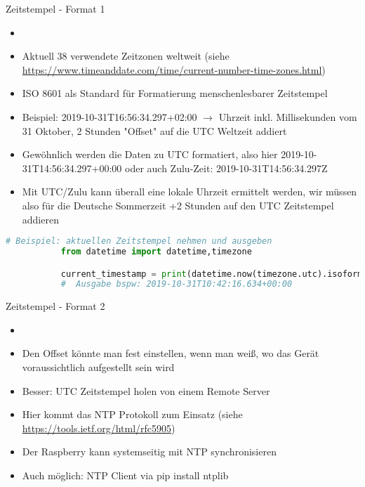 \begin{frame}[fragile]{Zeitstempel - Format 1}
    \begin{itemize}
        \setlength{\itemindent}{2.4in}
        \item [\textbf{Wie sollten Zeitstempel formatiert sein?}]
    \end{itemize}

    \begin{itemize}
              \item Aktuell 38 verwendete Zeitzonen weltweit (siehe \url{https://www.timeanddate.com/time/current-number-time-zones.html})
               \item ISO 8601 als Standard für Formatierung menschenlesbarer Zeitstempel
               \item Beispiel: 2019-10-31T16:56:34.297+02:00 $\rightarrow$ Uhrzeit inkl. Millisekunden vom 31 Oktober, 2 Stunden "Offset" auf die UTC Weltzeit addiert 
               \item Gewöhnlich werden die Daten zu UTC formatiert, also hier 2019-10-31T14:56:34.297+00:00 oder auch Zulu-Zeit: 2019-10-31T14:56:34.297Z
               \item Mit UTC/Zulu kann überall eine lokale Uhrzeit ermittelt werden, wir müssen also für die Deutsche Sommerzeit +2 Stunden auf den UTC Zeitstempel addieren 
     \end{itemize}
       \begin{lstlisting}[language=Python, gobble=8]
        # Beispiel: aktuellen Zeitstempel nehmen und ausgeben          
           from datetime import datetime,timezone

           current_timestamp = print(datetime.now(timezone.utc).isoformat(timespec='milliseconds')) # aktueller Zeitstempel
           #  Ausgabe bspw: 2019-10-31T10:42:16.634+00:00 
        \end{lstlisting}

\end{frame}

\begin{frame}[fragile]{Zeitstempel - Format 2}
    \begin{itemize}
        \setlength{\itemindent}{2.4in}
        \item [\textbf{Aber woher bekommen wir den Offset?}]
    \end{itemize}

    \begin{itemize}
              \item  Den Offset könnte man fest einstellen, wenn man weiß, wo das Gerät voraussichtlich aufgestellt sein wird
               \item Besser: UTC Zeitstempel holen von einem Remote Server
               \item Hier kommt das NTP Protokoll zum Einsatz (siehe \url{https://tools.ietf.org/html/rfc5905})
               \item Der Raspberry kann systemseitig mit NTP synchronisieren
               \item Auch möglich: NTP Client via pip install ntplib
    \end{itemize}
\end{frame}

